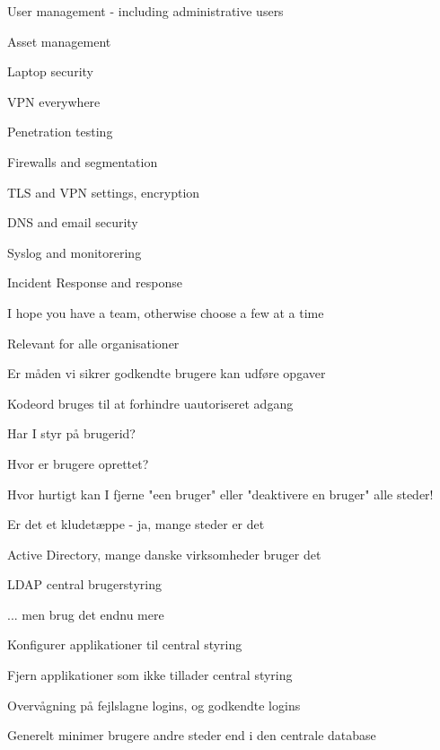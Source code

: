 \documentclass[Screen16to9,17pt]{foils}
\begin{document}

\begin{list2}
\item User management - including administrative users
\item Asset management
\item Laptop security
\item VPN everywhere
\item Penetration testing
\item Firewalls and segmentation
\item TLS and VPN settings, encryption
\item DNS and email security
\item Syslog and monitorering
\item Incident Response and response
\end{list2}

\vskip 5mm
\centerline{I hope you have a team, otherwise choose a few at a time}



\begin{list2}
\item Relevant for alle organisationer
\item Er måden vi sikrer godkendte brugere kan udføre opgaver
\item Kodeord bruges til at forhindre uautoriseret adgang
\item Har I styr på brugerid?
\item Hvor er brugere oprettet?
\item Hvor hurtigt kan I fjerne "een bruger" eller "deaktivere en bruger" alle steder!
\item Er det et kludetæppe - ja, mange steder er det
\end{list2}



\begin{list1}
\item Active Directory, mange danske virksomheder bruger det
\item LDAP central brugerstyring
\item ... men brug det endnu mere
\begin{list2}
\item Konfigurer applikationer til central styring
\item Fjern applikationer som ikke tillader central styring
\item Overvågning på fejlslagne logins, og godkendte logins
\end{list2}
\item Generelt minimer brugere andre steder end i den centrale database
\end{list1}
\end{document}
